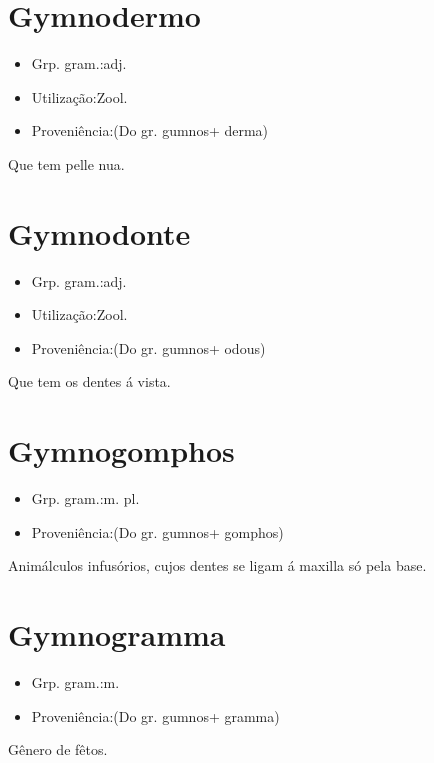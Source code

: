 \section{Gymnodermo}
\begin{itemize}
\item {Grp. gram.:adj.}
\end{itemize}
\begin{itemize}
\item {Utilização:Zool.}
\end{itemize}
\begin{itemize}
\item {Proveniência:(Do gr. \textunderscore gumnos\textunderscore  + \textunderscore derma\textunderscore )}
\end{itemize}
Que tem pelle nua.
\section{Gymnodonte}
\begin{itemize}
\item {Grp. gram.:adj.}
\end{itemize}
\begin{itemize}
\item {Utilização:Zool.}
\end{itemize}
\begin{itemize}
\item {Proveniência:(Do gr. \textunderscore gumnos\textunderscore  + \textunderscore odous\textunderscore )}
\end{itemize}
Que tem os dentes á vista.
\section{Gymnogomphos}
\begin{itemize}
\item {Grp. gram.:m. pl.}
\end{itemize}
\begin{itemize}
\item {Proveniência:(Do gr. \textunderscore gumnos\textunderscore  + \textunderscore gomphos\textunderscore )}
\end{itemize}
Animálculos infusórios, cujos dentes se ligam á maxilla só pela base.
\section{Gymnogramma}
\begin{itemize}
\item {Grp. gram.:m.}
\end{itemize}
\begin{itemize}
\item {Proveniência:(Do gr. \textunderscore gumnos\textunderscore  + \textunderscore gramma\textunderscore )}
\end{itemize}
Gênero de fêtos.
